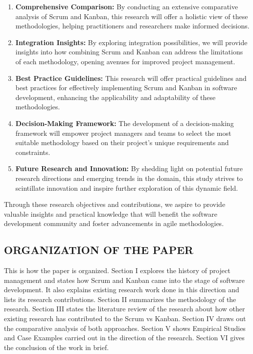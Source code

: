 \documentclass[conference]{IEEEtran}
\begin{document}
\begin{enumerate}
  \item \textbf{Comprehensive Comparison:} By conducting an extensive comparative analysis of Scrum and Kanban, this research will offer a holistic view of these methodologies, helping practitioners and researchers make informed decisions.

  \item \textbf{Integration Insights:} By exploring integration possibilities, we will provide insights into how combining Scrum and Kanban can address the limitations of each methodology, opening avenues for improved project management.

  \item \textbf{Best Practice Guidelines:} This research will offer practical guidelines and best practices for effectively implementing Scrum and Kanban in software development, enhancing the applicability and adaptability of these methodologies.

  \item \textbf{Decision-Making Framework:} The development of a decision-making framework will empower project managers and teams to select the most suitable methodology based on their project's unique requirements and constraints.

  \item \textbf{Future Research and Innovation:} By shedding light on potential future research directions and emerging trends in the domain, this study strives to scintillate innovation and inspire further exploration of this dynamic field.
\end{enumerate}

Through these research objectives and contributions, we aspire to provide valuable insights and practical knowledge that will benefit the software development community and foster advancements in agile methodologies.

\subsection{ORGANIZATION OF THE PAPER}

This is how the paper is organized. Section I explores the history of project management and states how Scrum and Kanban came into the stage of software development. It also explains existing research work done in this direction and lists its research contributions. Section II summarizes the methodology of the research. Section III states the literature review of the research about how other existing research has contributed to the Scrum vs Kanban. Section IV draws out the comparative analysis of both approaches. Section V shows Empirical Studies and Case Examples carried out in the direction of the research. Section VI gives the conclusion of the work in brief.
\end{document}
